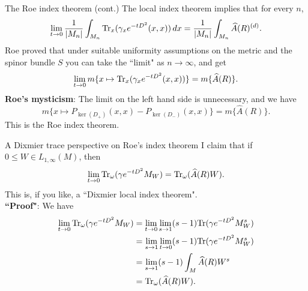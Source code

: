 \documentclass{beamer}
\numberwithin{equation}{section}
\theoremstyle{plain}
\theoremstyle{plain}
\theoremstyle{definition}
\theoremstyle{plain}
\theoremstyle{plain}
\theoremstyle{definition}
\newcommand{\tr}{{\rm Tr}}
\begin{document}
\begin{frame}{The Roe index theorem (cont.)}
    The local index theorem implies that for every $n$,
    \begin{equation*}
        \lim_{t\to 0} \frac{1}{|M_n|}\int_{M_n}\tr_x(\gamma_xe^{-tD^2}(x,x))\,dx = \frac{1}{|M_n|}\int_{M_n} \widehat{A}(R)^{(d)}.
    \end{equation*}
    Roe proved that under suitable uniformity assumptions on the metric and the spinor bundle $S$ you can take the ``limit" as $n\to\infty$, and get
    \begin{equation*}
        \lim_{t\to 0} m\{x\mapsto \tr_x(\gamma_xe^{-tD^2}(x,x))\} = m\{\widehat{A}(R)\}.
    \end{equation*}
    \pause
    \textbf{Roe's mysticism}: The limit on the left hand side is unnecessary, and we have
    \begin{equation*}
        m\{x\mapsto P_{\ker(D_+)}(x,x)-P_{\ker(D_-)}(x,x)\} = m\{\widehat{A}(R)\}.
    \end{equation*}
    This is the Roe index theorem. 
\end{frame}

\begin{frame}{A Dixmier trace perspective on Roe's index theorem}
    I claim that if $0\leq W \in L_{1,\infty}(M)$, then
    \begin{equation*}
        \lim_{t\to 0}\tr_{\omega}(\gamma e^{-tD^2}M_W) = \tr_{\omega}(\widehat{A}(R)W).
    \end{equation*}
    This is, if you like, a ``Dixmier local index theorem".\\
    \pause
    \textbf{``Proof"}:
    We have
    \begin{align*}
        \lim_{t\to 0}\tr_{\omega}(\gamma e^{-tD^2}M_W) &= \lim_{t\to 0}\lim_{s\to 1} (s-1)\tr(\gamma e^{-tD^2}M_W^s)\\
                                                       &= \lim_{s\to 1}\lim_{t\to 0} (s-1)\tr(\gamma e^{-tD^2}M_W^s)\\
                                                       &= \lim_{s\to 1}(s-1)\int_{M} \widehat{A}(R)W^s\\
                                                       &= \tr_{\omega}(\widehat{A}(R)W).
    \end{align*}
\end{frame}
\end{document}
